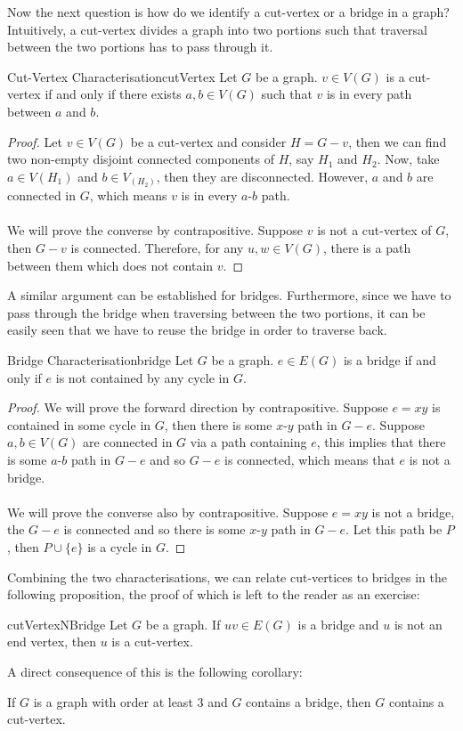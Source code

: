 \documentclass[math, code]{amznotes}
\theoremstyle{remark}
\begin{document}
Now the next question is how do we identify a cut-vertex or a bridge in a graph? Intuitively, a cut-vertex divides a graph into two portions such that traversal between the two portions has to pass through it.
\begin{thmbox}{Cut-Vertex Characterisation}{cutVertex}
    Let $G$ be a graph. $v \in V(G)$ is a cut-vertex if and only if there exists $a, b \in V(G)$ such that $v$ is in every path between $a$ and $b$.
    \tcblower
    \begin{proof}
        Let $v \in V(G)$ be a cut-vertex and consider $H = G - v$, then we can find two non-empty disjoint connected components of $H$, say $H_1$ and $H_2$. Now, take $a \in V(H_1)$ and $b \in V_(H_2)$, then they are disconnected. However, $a$ and $b$ are connected in $G$, which means $v$ is in every $a$-$b$ path.
        \\\\
        We will prove the converse by contrapositive. Suppose $v$ is not a cut-vertex of $G$, then $G - v$ is connected. Therefore, for any $u, w \in V(G)$, there is a path between them which does not contain $v$.
    \end{proof}
\end{thmbox}
A similar argument can be established for bridges. Furthermore, since we have to pass through the bridge when traversing between the two portions, it can be easily seen that we have to reuse the bridge in order to traverse back.
\begin{thmbox}{Bridge Characterisation}{bridge}
    Let $G$ be a graph. $e \in E(G)$ is a bridge if and only if $e$ is not contained by any cycle in $G$.
    \tcblower
    \begin{proof}
        We will prove the forward direction by contrapositive. Suppose $e = xy$ is contained in some cycle in $G$, then there is some $x$-$y$ path in $G - e$. Suppose $a, b \in V(G)$ are connected in $G$ via a path containing $e$, this implies that there is some $a$-$b$ path in $G - e$ and so $G - e$ is connected, which means that $e$ is not a bridge.
        \\\\
        We will prove the converse also by contrapositive. Suppose $e = xy$ is not a bridge, the $G - e$ is connected and so there is some $x$-$y$ path in $G - e$. Let this path be $P$, then $P \cup \{e\}$ is a cycle in $G$.
    \end{proof}
\end{thmbox}
Combining the two characterisations, we can relate cut-vertices to bridges in the following proposition, the proof of which is left to the reader as an exercise:
\begin{probox}{}{cutVertexNBridge}
    Let $G$ be a graph. If $uv \in E(G)$ is a bridge and $u$ is not an end vertex, then $u$ is a cut-vertex.
\end{probox}
A direct consequence of this is the following corollary:
\begin{corbox}{}{}
    If $G$ is a graph with order at least $3$ and $G$ contains a bridge, then $G$ contains a cut-vertex.
\end{corbox}
\end{document}
